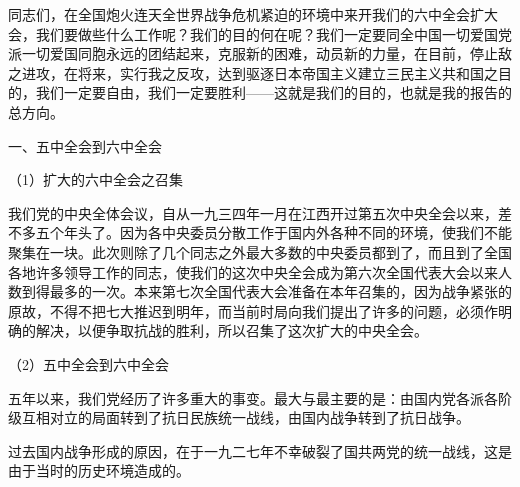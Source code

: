 \documentclass[UTF8, 12pt, a4paper]{ctexrep}
\begin{document}
同志们，在全国炮火连天全世界战争危机紧迫的环境中来开我们的六中全会扩大会，我们要做些什么工作呢？我们的目的何在呢？我们一定要同全中国一切爱国党派一切爱国同胞永远的团结起来，克服新的困难，动员新的力量，在目前，停止敌之进攻，在将来，实行我之反攻，达到驱逐日本帝国主义建立三民主义共和国之目的，我们一定要自由，我们一定要胜利——这就是我们的目的，也就是我的报告的总方向。

一、五中全会到六中全会

（1）扩大的六中全会之召集

我们党的中央全体会议，自从一九三四年一月在江西开过第五次中央全会以来，差不多五个年头了。因为各中央委员分散工作于国内外各种不同的环境，使我们不能聚集在一块。此次则除了几个同志之外最大多数的中央委员都到了，而且到了全国各地许多领导工作的同志，使我们的这次中央全会成为第六次全国代表大会以来人数到得最多的一次。本来第七次全国代表大会准备在本年召集的，因为战争紧张的原故，不得不把七大推迟到明年，而当前时局向我们提出了许多的问题，必须作明确的解决，以便争取抗战的胜利，所以召集了这次扩大的中央全会。

（2）五中全会到六中全会

五年以来，我们党经历了许多重大的事变。最大与最主要的是：由国内党各派各阶级互相对立的局面转到了抗日民族统一战线，由国内战争转到了抗日战争。

过去国内战争形成的原因，在于一九二七年不幸破裂了国共两党的统一战线，这是由于当时的历史环境造成的。
\end{document}
